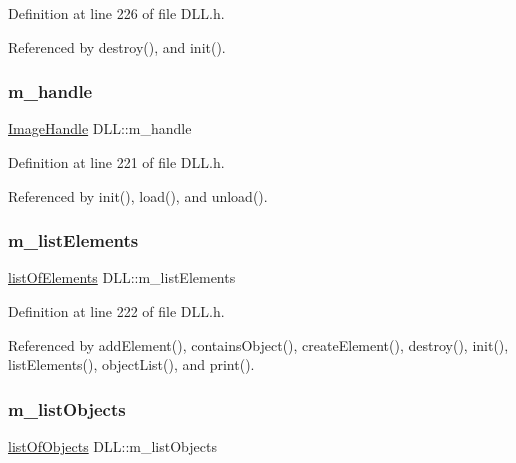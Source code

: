 Definition at line 226 of file D\+L\+L.\+h.



Referenced by destroy(), and init().

\mbox{\label{classDLL_a2ca22015aef35c5d61f8daaf3c070154}} 
\subsubsection{\texorpdfstring{m\+\_\+handle}{m\_handle}}
{\footnotesize\ttfamily \hyperlink{classDLL_addaefe5c907a5f357cc18718300f22b0}{Image\+Handle} D\+L\+L\+::m\+\_\+handle\hspace{0.3cm}{\ttfamily [private]}}



Definition at line 221 of file D\+L\+L.\+h.



Referenced by init(), load(), and unload().

\mbox{\label{classDLL_a2e88d7167245fd7b6a000817583643ed}} 
\subsubsection{\texorpdfstring{m\+\_\+list\+Elements}{m\_listElements}}
{\footnotesize\ttfamily \hyperlink{classDLL_a36792635c3cd36adbaaef2ff7152046e}{list\+Of\+Elements} D\+L\+L\+::m\+\_\+list\+Elements\hspace{0.3cm}{\ttfamily [private]}}



Definition at line 222 of file D\+L\+L.\+h.



Referenced by add\+Element(), contains\+Object(), create\+Element(), destroy(), init(), list\+Elements(), object\+List(), and print().

\mbox{\label{classDLL_af48201f52f29a849489e0104a440bcbb}} 
\subsubsection{\texorpdfstring{m\+\_\+list\+Objects}{m\_listObjects}}
{\footnotesize\ttfamily \hyperlink{classDLL_a68629aa6f9103c5a3082511ff8218b1e}{list\+Of\+Objects} D\+L\+L\+::m\+\_\+list\+Objects\hspace{0.3cm}{\ttfamily [private]}}



